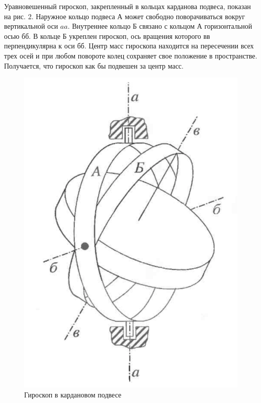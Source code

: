 \documentclass[a4paper,12pt]{article} %
\begin{document}
Уравновешенный гироскоп, закрепленный в кольцах карданова подвеса, показан на рис. 2. Наружное кольцо подвеса $\text{А}$ может свободно поворачиваться вокруг вертикальной оси $aa$. Внутреннее кольцо $\text{Б}$ связано с кольцом $\text{А}$ горизонтальной осью $\text{бб}$. В кольце $\text{Б}$ укреплен гироскоп, ось вращения которого $\text{вв}$ перпендикулярна к оси $\text{бб}$. Центр масс гироскопа находится на пересечении всех трех осей и при любом повороте колец сохраняет свое положение в пространстве. Получается, что гироскоп как бы подвешен за центр масс.
\begin{figure}[h]
\centering
\includegraphics[scale=0.5]{2}
\caption{Гироскоп в кардановом подвесе}
\end{figure}
\end{document}
